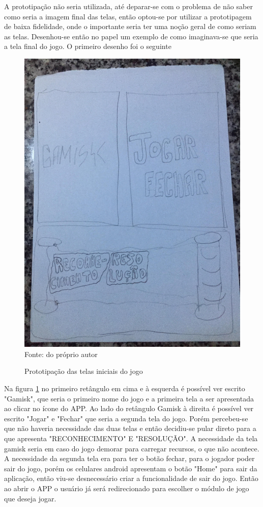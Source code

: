 A prototipação não seria utilizada, até deparar-se com o problema de não saber como seria a imagem final das telas, então optou-se por utilizar a prototipagem de baixa fidelidade, onde o importante seria ter uma noção geral de como seriam as telas. Desenhou-se então no papel um exemplo de como imaginava-se que seria a tela final do jogo. O primeiro desenho foi o seguinte

\begin{figure}[H]
\centering
\caption{Prototipação das telas iniciais do jogo}
\label{prot0}
\includegraphics[scale=0.14]{figuras/prot0.jpg}
\\
\small{Fonte: do próprio autor}
\end{figure}

Na figura \ref{prot0} no primeiro retângulo em cima e à esquerda é possível ver escrito "Gamisk", que seria o primeiro nome do jogo e a primeira tela a ser apresentada ao clicar no ícone do APP. Ao lado do retângulo Gamisk à direita é possível ver escrito "Jogar" e "Fechar" que seria a segunda tela do jogo. Porém percebeu-se que não haveria necessidade das duas telas e então decidiu-se pular direto para a que apresenta "RECONHECIMENTO" E "RESOLUÇÃO". A necessidade da tela gamisk seria em caso do jogo demorar para carregar recursos, o que não acontece. A necessidade da segunda tela era para ter o botão fechar, para o jogador poder sair do jogo, porém os celulares android apresentam o botão "Home" para sair da aplicação, então viu-se desnecessário criar a funcionalidade de sair do jogo. Então ao abrir o APP o usuário já será redirecionado para escolher o módulo de jogo que deseja jogar.


